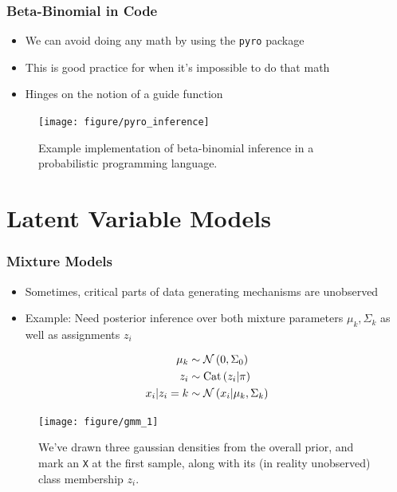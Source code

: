 \documentclass[10pt,mathserif]{beamer}
\begin{document}
\begin{frame}
  \frametitle{Beta-Binomial in Code}
  \begin{itemize}
  \item We can avoid doing any math by using the \texttt{pyro} package
  \item This is good practice for when it's impossible to do that math
  \item Hinges on the notion of a guide function
  \end{itemize}
  \begin{figure}[ht]
    \centering
    \texttt{[image: figure/pyro\_inference]}
    \caption{Example implementation of beta-binomial inference in a
      probabilistic programming language. \label{fig:pyro_inference} }
\end{figure}
\end{frame}

\section{Latent Variable Models}
\label{sec:latent_variable_models}
\begin{frame}
  \frametitle{Mixture Models}
  \begin{itemize}
  \item Sometimes, critical parts of data generating mechanisms are unobserved
  \item Example: Need posterior inference over both mixture parameters $\mu_k,
    \Sigma_k$ as well as assignments $z_i$
  \end{itemize}
  \begin{align*}
    \mu_{k} &\sim \mathcal{N}\left(0, \Sigma_{0}\right) \\
    z_i &\sim \textnormal{Cat}\left(z_i \vert \pi\right) \\
    x_i \vert z_i = k &\sim \mathcal{N}\left(x_i \vert \mu_{k}, \Sigma_k\right)
  \end{align*}
\begin{figure}[ht]
  \centering
  \texttt{[image: figure/gmm\_1]}
  \caption{We've drawn three gaussian densities from the overall prior, and mark
    an \texttt{X} at the first sample, along with its (in reality unobserved)
    class membership $z_i$. \label{fig:gmm_1} }
\end{figure}
\end{frame}
\end{document}

